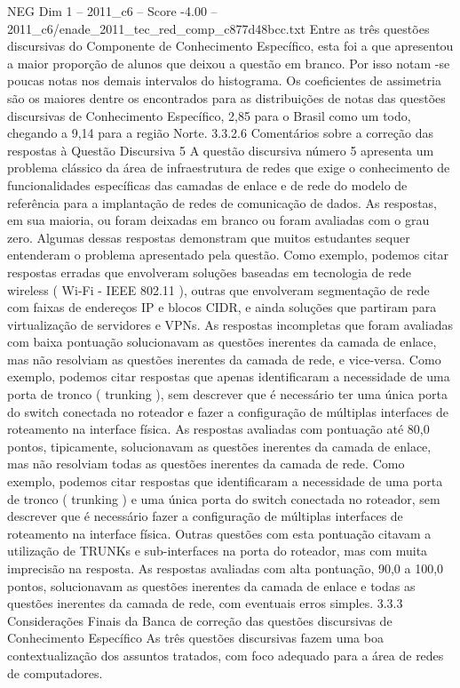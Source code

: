 \begin{textsample}{NEG Dim 1 – 2011\_c6 – Score -4.00 – 2011\_c6/enade\_2011\_tec\_red\_comp\_c877d48bcc.txt}
Entre as três questões discursivas do Componente de Conhecimento Específico, esta foi a que apresentou a maior proporção de alunos que deixou a questão em branco.
Por isso notam -se poucas notas nos demais intervalos do histograma.
Os coeficientes de assimetria são os maiores dentre os encontrados para as distribuições de notas das questões discursivas de Conhecimento Específico, 2,85 para o Brasil como um todo, chegando a 9,14 para a região Norte. 3.3.2.6 Comentários sobre a correção das respostas à Questão Discursiva 5 A questão discursiva número 5 apresenta um problema clássico da área de infraestrutura de redes que exige o conhecimento de funcionalidades específicas das camadas de enlace e de rede do modelo de referência para a implantação de redes de comunicação de dados.
As respostas, em sua maioria, ou foram deixadas em branco ou foram avaliadas com o grau zero.
Algumas dessas respostas demonstram que muitos estudantes sequer entenderam o problema apresentado pela questão.
Como exemplo, podemos citar respostas erradas que envolveram soluções baseadas em tecnologia de rede wireless ( Wi-Fi - IEEE 802.11 ), outras que envolveram segmentação de rede com faixas de endereços IP e blocos CIDR, e ainda soluções que partiram para virtualização de servidores e VPNs.
As respostas incompletas que foram avaliadas com baixa pontuação solucionavam as questões inerentes da camada de enlace, mas não resolviam as questões inerentes da camada de rede, e vice-versa.
Como exemplo, podemos citar respostas que apenas identificaram a necessidade de uma porta de tronco ( trunking ), sem descrever que é necessário ter uma única porta do switch conectada no roteador e fazer a configuração de múltiplas interfaces de roteamento na interface física.
As respostas avaliadas com pontuação até 80,0 pontos, tipicamente, solucionavam as questões inerentes da camada de enlace, mas não resolviam todas as questões inerentes da camada de rede.
Como exemplo, podemos citar respostas que identificaram a necessidade de uma porta de tronco ( trunking ) e uma única porta do switch conectada no roteador, sem descrever que é necessário fazer a configuração de múltiplas interfaces de roteamento na interface física.
Outras questões com esta pontuação citavam a utilização de TRUNKs e sub-interfaces na porta do roteador, mas com muita imprecisão na resposta.
As respostas avaliadas com alta pontuação, 90,0 a 100,0 pontos, solucionavam as questões inerentes da camada de enlace e todas as questões inerentes da camada de rede, com eventuais erros simples. 3.3.3 Considerações Finais da Banca de correção das questões discursivas de Conhecimento Específico As três questões discursivas fazem uma boa contextualização dos assuntos tratados, com foco adequado para a área de redes de computadores.

\end{textsample}
